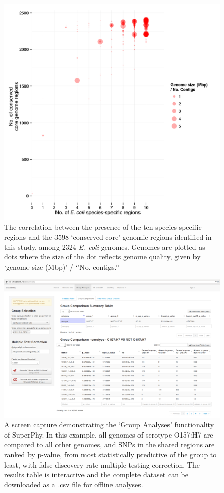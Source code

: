 \documentclass[doublespacing, linenumbers]{bmcart}
\begin{document}
\begin{backmatter}
\newpage
\begin{figure}[h!]
  \includegraphics[width=1\columnwidth]{images/specific_scatter.png}
  \caption{The correlation between the presence of the ten species-specific regions and the 3598 `conserved core' genomic regions identified in this study, among 2324 \textit{E. coli} genomes. Genomes are plotted as dots where the size of the dot reflects genome quality, given by `genome size (Mbp)' / `'No. contigs.''}
  \label{fig:specific_scatter}
 \end{figure}

\begin{landscape}
\newpage
\begin{figure}[h!]
  \includegraphics[width=0.9\columnwidth]{images/gc_fet_results.png}
  \caption{A screen capture demonstrating the `Group Analyses' functionality of SuperPhy. In this example, all genomes of serotype O157:H7 are compared to all other genomes, and SNPs in the shared regions are ranked by p-value, from most statistically predictive of the group to least, with false discovery rate multiple testing correction. The results table is interactive and the complete dataset can be downloaded as a .csv file for offline analyses.}
  \label{fig:fet_results}
\end{figure}


\end{landscape}
\end{backmatter}
\end{document}
